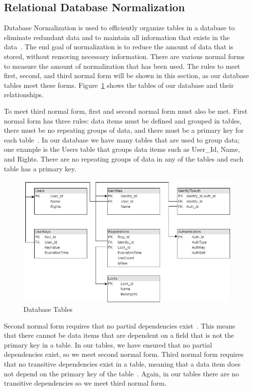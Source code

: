 \documentclass[12pt]{report}
\let\Oldsubsection\subsection
\renewcommand{\subsection}{\FloatBarrier\Oldsubsection}
\begin{document}
\subsection{Relational Database Normalization} \label{relational-database-normalization}

Database Normalization is used to efficiently organize tables in a database to eliminate redundant
data and to maintain all information that exists in the data~\autocite{DBNORMALIZATION}.
The end goal of normalization is to
reduce the amount of data that is stored, without removing necessary information. There are various
normal forms to measure the amount of normalization that has been used. The rules to meet first,
second, and third normal form will be shown in this section, as our database tables meet these forms.
Figure~\ref{fig:db-tables} shows the tables of our database and their relationships.

To meet third normal form, first and second normal form must also be met. First normal form
has three rules: data items must be defined and grouped in tables, there must be no repeating
groups of data, and there must be a primary key for each table~\autocite{FIRSTNORMALFORM}.
In our database we have many tables
that are used to group data; one example is the Users table that groups data items such as User\_Id,
Name, and Rights. There are no repeating groups of data in any of the tables and each table has a
primary key.

\begin{figure}
    \includegraphics[width=\textwidth]{Diagrams/Server_Diagrams/DB_Tables}
    \caption{Database Tables}
    \label{fig:db-tables}
\end{figure}

Second normal form requires that no partial dependencies exist~\autocite{SECONDNORMALFORM}. This means that there
cannot be data items that are dependent on a field that is not the primary key in a table. In our
tables, we have ensured that no partial dependencies exist, so we meet second normal form.
Third normal form requires that no transitive dependencies exist in a table, meaning that a data item
does not depend on the primary key of the table~\autocite{THIRDNORMALFORM}. Again, in our tables there
are no transitive dependencies so we meet third normal form.
\end{document}
